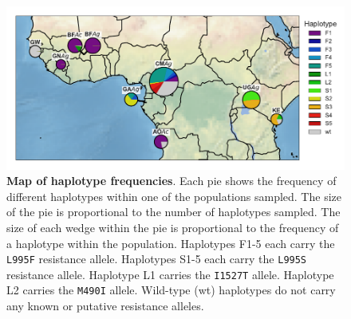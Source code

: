\documentclass[a4paper,11pt,abstracton,hidelinks]{scrartcl}
\begin{document}
%
\begin{figure}[!t]
  \includegraphics[width=1.1\linewidth,center]{artwork/outbreak_map_base.pdf}
  \caption{\textbf{Map of haplotype frequencies}. Each pie shows the frequency of different haplotypes within one of the populations sampled. The size of the pie is proportional to the number of haplotypes sampled. The size of each wedge within the pie is proportional to the frequency of a haplotype within the population. Haplotypes F1-5 each carry the \texttt{L995F} resistance allele. Haplotypes S1-5 each carry the \texttt{L995S} resistance allele. Haplotype L1 carries the \texttt{I1527T} allele. Haplotype L2 carries the \texttt{M490I} allele. Wild-type (wt) haplotypes do not carry any known or putative resistance alleles.}
  \label{fig:map}
\end{figure}
\end{document}
